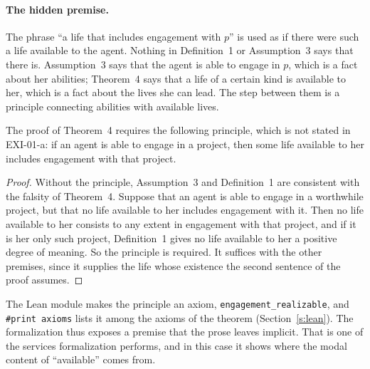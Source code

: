 
\paragraph{The hidden premise.} The phrase \enquote{a life that includes engagement with $p$} is used as if there were such a life available to the agent. Nothing in Definition~1 or Assumption~3 says that there is. Assumption~3 says that the agent is able to engage in $p$, which is a fact about her abilities; Theorem~4 says that a life of a certain kind is available to her, which is a fact about the lives she can lead. The step between them is a principle connecting abilities with available lives.

\begin{proposition}\label{p:bridge}
The proof of Theorem~4 requires the following principle, which is not stated in EXI-01-a: if an agent is able to engage in a project, then some life available to her includes engagement with that project.
\end{proposition}

\begin{proof}
Without the principle, Assumption~3 and Definition~1 are consistent with the falsity of Theorem~4. Suppose that an agent is able to engage in a worthwhile project, but that no life available to her includes engagement with it. Then no life available to her consists to any extent in engagement with that project, and if it is her only such project, Definition~1 gives no life available to her a positive degree of meaning. So the principle is required. It suffices with the other premises, since it supplies the life whose existence the second sentence of the proof assumes.
\end{proof}

The Lean module makes the principle an axiom, \texttt{engagement\_realizable}, and \texttt{\#print axioms} lists it among the axioms of the theorem (Section~\ref{s:lean}). The formalization thus exposes a premise that the prose leaves implicit. That is one of the services formalization performs, and in this case it shows where the modal content of \enquote{available} comes from.

